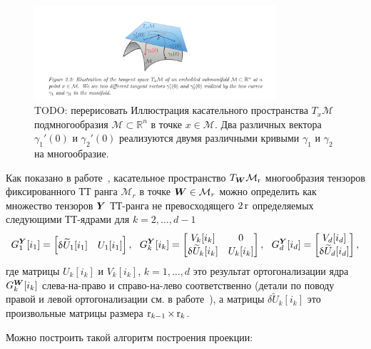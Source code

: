 \begin{figure}[t]
\begin{center}
  \includegraphics[width=0.8\textwidth]{images/tangent_space.png}
  \caption{\alert{TODO: перерисовать} Иллюстрация касательного пространства $T_x \mathcal{M}$ подмногообразия $\mathcal{M} \subset \mathbb{R}^n$ в точке $x \in \mathcal{M}$. Два различных вектора $\gamma_1'(0)$ и $\gamma_2'(0)$ реализуются двумя различными кривыми $\gamma_1$ и $\gamma_2$ на многообразие. \label{fig:tangent-space}}
  \end{center}
\end{figure}


Как показано в работе~\cite{Steinlechner2016}, касательное пространство $T_{\boldsymbol{W}} \mathcal{M}_{\operatorname{r}}$ многообразия тензоров фиксированного ТТ ранга $\mathcal{M}_r$ в точке $\boldsymbol{W} \in \mathcal{M}_r$ можно определить как множество тензоров $\boldsymbol{Y}$ ТТ-ранга не превосходящего $2 \operatorname{r}$ определяемых следующими ТТ-ядрами для $k = 2, \ldots, d-1$
\[
G_1^{\boldsymbol{Y}}[i_1] = \begin{bmatrix}
\updelta \widetilde{U}_1[i_1] & U_1[i_1]
\end{bmatrix}, ~~ G_k^{\boldsymbol{Y}}[i_k] = \begin{bmatrix}
V_k[i_k] & 0\\
\updelta \widetilde{U}_k[i_k] & U_k[i_k]\\
\end{bmatrix}, ~~ G_d^{\boldsymbol{Y}}[i_d] = \begin{bmatrix}
V_d[i_d]\\
\updelta \widetilde{U}_d[i_d]\\
\end{bmatrix},
\]
где матрицы $U_k[i_k]$ и $V_k[i_k]$, $k = 1, \ldots, d$ это результат ортогонализации ядра $G^{\boldsymbol{W}}_k[i_k]$ слева-на-право и справо-на-лево соответственно (детали по поводу правой и левой ортогонализации см. в работе~\cite{oseledets2011ttMain}), а матрицы $\delta \widetilde{U}_k[i_k]$ это произвольные матрицы размера $\operatorname{r}_{k-1} \times \operatorname{r}_k$.


Можно построить такой алгоритм построения проекции:

